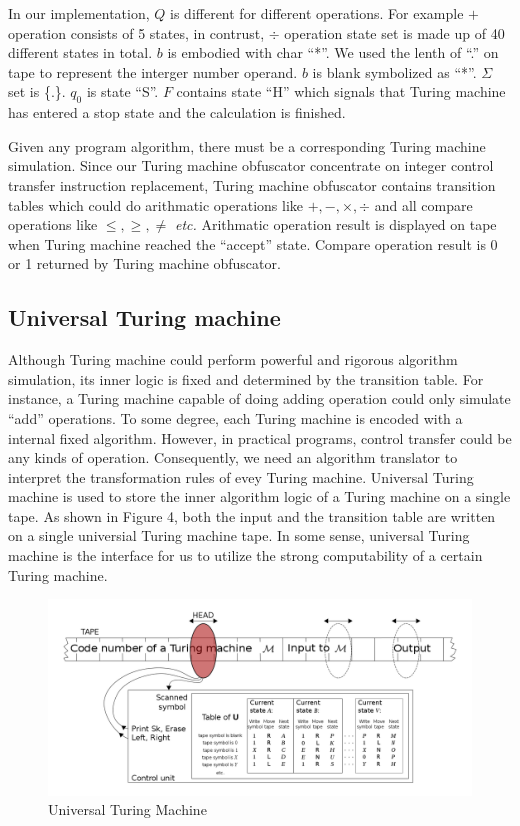 \documentclass[lnicst]{svmultln}
\begin{document}
In our implementation, \(Q\) is different for different operations. For example \(+\) operation consists of 5 states, in contrust, \(\div\) operation state set is made up of 40 different states in total. \(b\) is embodied with char ``*''. We used the lenth of ``.'' on tape to represent the interger number operand. \(b\) is blank symbolized as ``*''. \(\Sigma\) set is  \{.\}. \(q_0\) is state ``S''. \(F\) contains state ``H'' which signals that Turing machine has entered a stop state and the calculation is finished. 

Given any program algorithm, there must be a corresponding Turing machine simulation. Since our Turing machine obfuscator concentrate on integer control transfer instruction replacement, Turing machine obfuscator contains transition tables which could do arithmatic operations like \(+, -, \times, \div\) and all compare operations like \(\leq,\geq , \neq\) \textit{etc.} Arithmatic operation result is displayed on tape when Turing machine reached the ``accept'' state. Compare operation result is 0 or 1 returned by Turing machine obfuscator.
\subsection{Universal Turing machine}
Although Turing machine could perform powerful and rigorous algorithm simulation, its inner logic is fixed and determined by the transition table. For instance, a Turing machine capable of doing adding operation could only simulate ``add'' operations. To some degree, each Turing machine is encoded with a internal fixed algorithm. However, in practical programs, control transfer could be any kinds of operation. Consequently, we need an algorithm translator to interpret the transformation rules of evey Turing machine. Universal Turing machine is used to store the inner algorithm logic of a Turing machine on a single tape. As shown in Figure 4, both the input and the transition table are written on a single universial Turing machine tape. In some sense, universal Turing machine is the interface for us to utilize the strong computability of a certain Turing machine.

\begin{figure}
 \includegraphics[width=\linewidth]{UTM.png}
 \caption{Universal Turing Machine \cite{UTM}}
 \label{Figure 4}
\end{figure}
\end{document}
